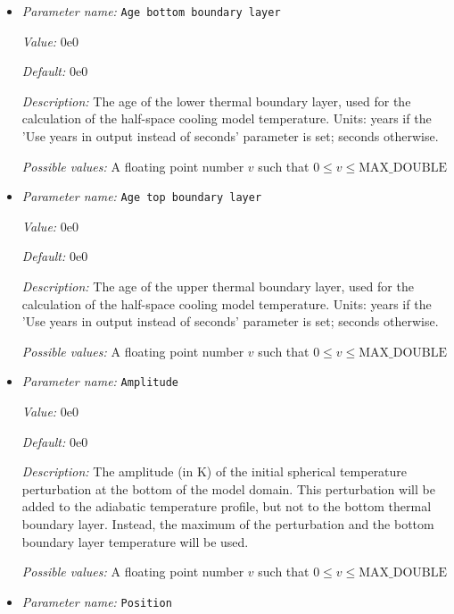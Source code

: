 \begin{itemize}
\item {\it Parameter name:} {\tt Age bottom boundary layer}
\label{parameters:Initial temperature model/Adiabatic/Age bottom boundary layer}


{\it Value:} 0e0


{\it Default:} 0e0


{\it Description:} The age of the lower thermal boundary layer, used for the calculation of the half-space cooling model temperature. Units: years if the 'Use years in output instead of seconds' parameter is set; seconds otherwise.


{\it Possible values:} A floating point number $v$ such that $0 \leq v \leq \text{MAX\_DOUBLE}$
\item {\it Parameter name:} {\tt Age top boundary layer}
\label{parameters:Initial temperature model/Adiabatic/Age top boundary layer}


{\it Value:} 0e0


{\it Default:} 0e0


{\it Description:} The age of the upper thermal boundary layer, used for the calculation of the half-space cooling model temperature. Units: years if the 'Use years in output instead of seconds' parameter is set; seconds otherwise.


{\it Possible values:} A floating point number $v$ such that $0 \leq v \leq \text{MAX\_DOUBLE}$
\item {\it Parameter name:} {\tt Amplitude}
\label{parameters:Initial temperature model/Adiabatic/Amplitude}


{\it Value:} 0e0


{\it Default:} 0e0


{\it Description:} The amplitude (in K) of the initial spherical temperature perturbation at the bottom of the model domain. This perturbation will be added to the adiabatic temperature profile, but not to the bottom thermal boundary layer. Instead, the maximum of the perturbation and the bottom boundary layer temperature will be used.


{\it Possible values:} A floating point number $v$ such that $0 \leq v \leq \text{MAX\_DOUBLE}$
\item {\it Parameter name:} {\tt Position}
\label{parameters:Initial temperature model/Adiabatic/Position}



\end{itemize}
